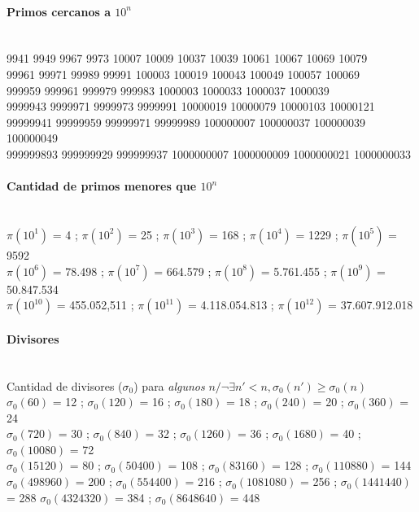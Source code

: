 \paragraph{Primos cercanos a $10^n$}\ \\
9941 9949 9967 9973 10007 10009 10037 10039 10061 10067 10069 10079\\
99961 99971 99989 99991 100003 100019 100043 100049 100057 100069\\
999959 999961 999979 999983 1000003 1000033 1000037 1000039\\
9999943 9999971 9999973 9999991 10000019 10000079 10000103 10000121\\
99999941 99999959 99999971 99999989 100000007 100000037 100000039 100000049\\
999999893 999999929 999999937 1000000007 1000000009 1000000021 1000000033
 
\paragraph{Cantidad de primos menores que $10^n$}\ \\
$\pi(10^1)$ = 4 ;
$\pi(10^2)$ = 25 ;
$\pi(10^3)$ = 168 ;
$\pi(10^4)$ = 1229 ;
$\pi(10^5)$ = 9592 \\
$\pi(10^6)$ = 78.498 ;
$\pi(10^7)$ = 664.579 ;
$\pi(10^8)$ = 5.761.455 ;
$\pi(10^9)$ = 50.847.534 \\
$\pi(10^{10})$ = 455.052,511 ;
$\pi(10^{11})$ = 4.118.054.813 ;
$\pi(10^{12})$ = 37.607.912.018%
%
%
%

\paragraph{Divisores} \ \\
Cantidad de divisores ($\sigma_0$) para \emph{algunos} $n / \neg\exists n'<n, \sigma_0(n') \geqslant \sigma_0(n)$ \\
$\sigma_0(60)$ = 12 ; $\sigma_0(120)$ = 16 ; $\sigma_0(180)$ = 18 ; $\sigma_0(240)$ = 20 ; $\sigma_0(360)$ = 24 \\
$\sigma_0(720)$ = 30 ; $\sigma_0(840)$ = 32 ; $\sigma_0(1260)$ = 36 ; $\sigma_0(1680)$ = 40 ; $\sigma_0(10080)$ = 72 \\ $\sigma_0(15120)$ = 80 ; $\sigma_0(50400)$ = 108 ; $\sigma_0(83160)$ = 128 ; $\sigma_0(110880)$ = 144 \\
$\sigma_0(498960)$ = 200 ; $\sigma_0(554400)$ = 216 ; $\sigma_0(1081080)$ = 256 ; $\sigma_0(1441440)$ = 288  $\sigma_0(4324320)$ = 384 ; $\sigma_0(8648640)$ = 448
 
